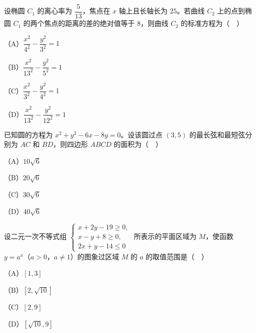 \begin{question}
设椭圆 $C_1$ 的离心率为 $\dfrac5{13}$，焦点在 $x$ 轴上且长轴长为 $25$。若曲线 $C_2$ 上的点到椭圆 $C_1$ 的两个焦点的距离的差的绝对值等于 $8$，则曲线 $C_2$ 的标准方程为（　）

（A）$\dfrac{x^2}{4^2}-\dfrac{y^2}{3^2}=1$

（B）$\dfrac{x^2}{13^2}-\dfrac{y^2}{5^2}=1$

（C）$\dfrac{x^2}{3^2}-\dfrac{y^2}{4^2}=1$

（D）$\dfrac{x^2}{13^2}-\dfrac{y^2}{12^2}=1$

\end{question}
\begin{question}
已知圆的方程为 $x^2+y^2-6x-8y=0$。设该圆过点 $(3,5)$ 的最长弦和最短弦分别为 $AC$ 和 $BD$，则四边形 $ABCD$ 的面积为（　）

（A）$10\sqrt6$

（B）$20\sqrt6$

（C）$30\sqrt6$

（D）$40\sqrt6$

\end{question}
\begingroup
\renewenvironment{question}{\Needspace{0.42\textheight}}{}
\begin{question}
设二元一次不等式组 $\begin{cases}x+2y-19\geqslant0,\\ x-y+8\geqslant0,\\ 2x+y-14\leqslant0\end{cases}$ 所表示的平面区域为 $M$，使函数 $y=a^x$（$a>0$，$a\neq1$）的图象过区域 $M$ 的 $a$ 的取值范围是（　）

（A）$[1,3]$

（B）$[2,\sqrt{10}]$

（C）$[2,9]$

（D）$[\sqrt{10},9]$

\end{question}
\endgroup
{}


